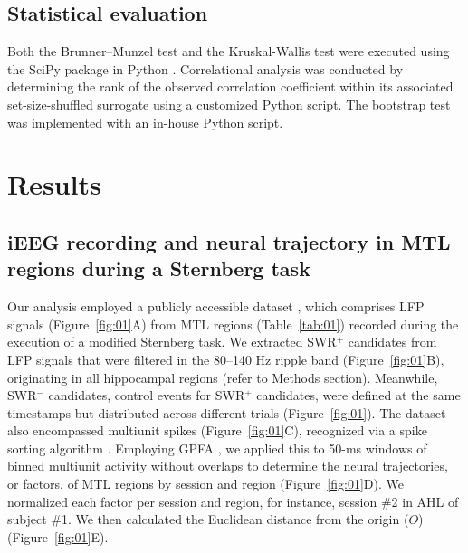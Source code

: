 \documentclass[final,3p,times,twocolumn]{elsarticle}
\begin{document}
\subsection{Statistical evaluation}
Both the Brunner--Munzel test and the Kruskal-Wallis test were executed using the SciPy package in Python \cite{virtanen_scipy_2020}. Correlational analysis was conducted by determining the rank of the observed correlation coefficient within its associated set-size-shuffled surrogate using a customized Python script. The bootstrap test was implemented with an in-house Python script.
\label{sec:methods}
\section{Results}
\subsection{iEEG recording and neural trajectory in MTL regions during a Sternberg task}
Our analysis employed a publicly accessible dataset \cite{boran_dataset_2020}, which comprises LFP signals (Figure~\ref{fig:01}A) from MTL regions (Table~\ref{tab:01}) recorded during the execution of a modified Sternberg task. We extracted SWR$^+$ candidates from LFP signals that were filtered in the 80--140 Hz ripple band (Figure~\ref{fig:01}B), originating in all hippocampal regions (refer to Methods section). Meanwhile, SWR$^-$ candidates, control events for SWR$^+$ candidates, were defined at the same timestamps but distributed across different trials (Figure~\ref{fig:01}). The dataset also encompassed multiunit spikes (Figure~\ref{fig:01}C), recognized via a spike sorting algorithm \cite{niediek_reliable_2016}. Employing GPFA \cite{yu_gaussian-process_2009}, we applied this to 50-ms windows of binned multiunit activity without overlaps to determine the neural trajectories, or factors, of MTL regions by session and region (Figure~\ref{fig:01}D). We normalized each factor per session and region, for instance, session \#2 in AHL of subject \#1. We then calculated the Euclidean distance from the origin ($O$) (Figure~\ref{fig:01}E).
\end{document}
